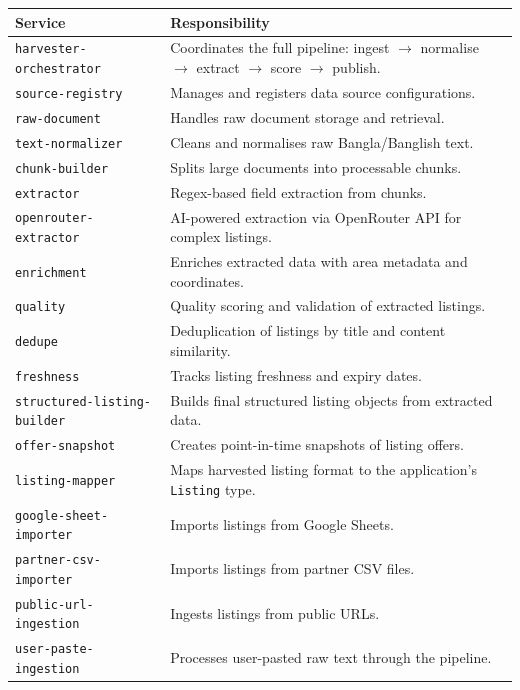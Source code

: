 \documentclass[12pt, a4paper, oneside]{report}
\newcommand{\typename}[1]{\texttt{\small\color{codeblue}#1}}
\begin{document}
\begin{longtable}{p{6cm} p{7cm}}
\toprule
\textbf{Service} & \textbf{Responsibility} \\
\midrule
\endhead
\texttt{harvester-orchestrator} & Coordinates the full pipeline: ingest $\to$ normalise $\to$ extract $\to$ score $\to$ publish. \\
\midrule
\texttt{source-registry} & Manages and registers data source configurations. \\
\midrule
\texttt{raw-document} & Handles raw document storage and retrieval. \\
\midrule
\texttt{text-normalizer} & Cleans and normalises raw Bangla/Banglish text. \\
\midrule
\texttt{chunk-builder} & Splits large documents into processable chunks. \\
\midrule
\texttt{extractor} & Regex-based field extraction from chunks. \\
\midrule
\texttt{openrouter-extractor} & AI-powered extraction via OpenRouter API for complex listings. \\
\midrule
\texttt{enrichment} & Enriches extracted data with area metadata and coordinates. \\
\midrule
\texttt{quality} & Quality scoring and validation of extracted listings. \\
\midrule
\texttt{dedupe} & Deduplication of listings by title and content similarity. \\
\midrule
\texttt{freshness} & Tracks listing freshness and expiry dates. \\
\midrule
\texttt{structured-listing-builder} & Builds final structured listing objects from extracted data. \\
\midrule
\texttt{offer-snapshot} & Creates point-in-time snapshots of listing offers. \\
\midrule
\texttt{listing-mapper} & Maps harvested listing format to the application's \typename{Listing} type. \\
\midrule
\texttt{google-sheet-importer} & Imports listings from Google Sheets. \\
\midrule
\texttt{partner-csv-importer} & Imports listings from partner CSV files. \\
\midrule
\texttt{public-url-ingestion} & Ingests listings from public URLs. \\
\midrule
\texttt{user-paste-ingestion} & Processes user-pasted raw text through the pipeline. \\
\bottomrule
\end{longtable}
\end{document}
